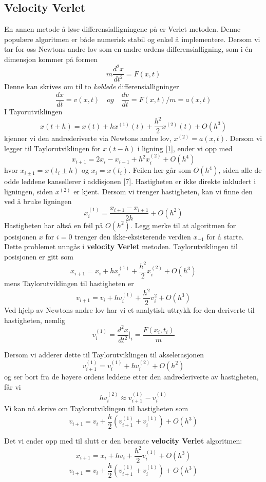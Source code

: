 \documentclass[11pt,a4paper]{article}
\begin{document}
\subsection{Velocity Verlet}
En annen metode å løse differensialligningene på er Verlet metoden. Denne populære algoritmen er både numerisk stabil og enkel å implementere. Dersom vi tar for oss Newtons andre lov som en andre ordens differensialligning, som i én dimensjon kommer på formen
\[ m \frac{d^2x}{dt^2} = F(x,t) \]
Denne kan skrives om til to \textit{koblede} differensialligninger
\[\frac{dx}{dt} = v(x,t) \quad og \quad \frac{dv}{dt} = F(x,t)/m = a(x,t) \]
I Tayorutviklingen
\begin{equation}
x(t+h) = x(t) + hx^{(1)}(t) + \frac{h^2}{2}x^{(2)}(t) + O(h^3)
\label{1}
\end{equation}
kjenner vi den andrederiverte via Newtons andre lov, $x^{(2)} = a(x,t)$. Dersom vi legger til Taylorutviklingen for $x(t-h)$ i ligning \ref{1}, ender vi opp med 
\[x_{i+1} = 2x_i - x_{i-1} + h^2x_i^{(2)} + O(h^4) \]
hvor $x_{i\pm 1} = x(t_i \pm h)$ og $x_i = x(t_i)$. Feilen her går som $O(h^4)$, siden alle de odde leddene kansellerer i addisjonen [7]. Hastigheten er ikke direkte inkludert i ligningen, siden $x^{(2)}$ er kjent. Dersom vi trenger hastigheten, kan vi finne den ved å bruke ligningen
\[x_i^{(1)} = \frac{x_{i+1} - x_{i+1}}{2h} + O(h^2) \]
Hastigheten har altså en feil på $O(h^2)$. Legg merke til at algoritmen for posisjonen $x$ for $i=0$ trenger den ikke-eksisterende verdien $x_{-1}$ for å starte. Dette problemet unngås i \textbf{velocity Verlet} metoden. Taylorutviklingen til posisjonen er gitt som
\[x_{i+1} = x_i + hx_i^{(1)} + \frac{h^2}{2}x_i^{(2)} + O(h^3) \]
mens Taylorutviklingen til hastigheten er 
\[v_{i+1} = v_i + hv_i^{(1)} + \frac{h^2}{2}v_i^{2} + O(h^3) \]
Ved hjelp av Newtons andre lov har vi et analytisk uttrykk for den deriverte til hastigheten, nemlig
\[ v_i^{(1)} = \frac{d^2x}{dt^2}|_i = \frac{F(x_i, t_i)}{m} \]

Dersom vi adderer dette til Taylorutviklingen til akselerasjonen
\[v_{i+1}^{(1)} = v_i^{(1)} + hv_i^{(2)} + O(h^2) \]
og ser bort fra de høyere ordens leddene etter den andrederiverte av hastigheten, får vi 
\[hv_i^{(2)} \approx v_{i+1}^{(1)} - v_i^{(1)}  \]
Vi kan nå skrive om Taylorutviklingen til hastigheten som
\[ v_{i+1} = v_i + \frac{h}{2}\left( v_{i+1}^{(1)} + v_i^{(1)} \right) + O(h^3)  \]

Det vi ender opp med til slutt er den berømte \textbf{velocity Verlet} algoritmen:
\[x_{i+1} = x_i + hv_i + \frac{h^2}{2}v_i^{(1)} + O(h^3)  \]
\[v_{i+1} = v_i + \frac{h}{2} \left( v_{i+1}^{(1)} + v_i^{(1)} \right) + O(h^3)  \]
\end{document}
